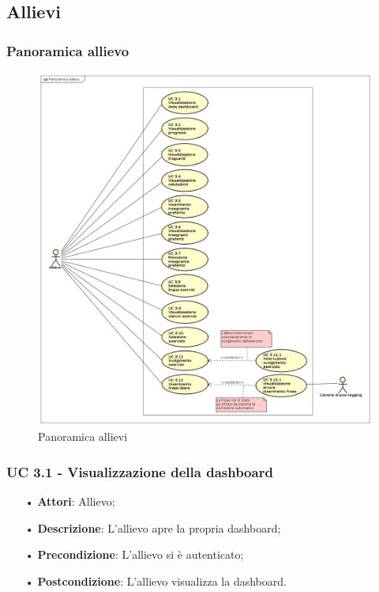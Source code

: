 \subsection{Allievi}
\subsubsection{Panoramica allievo}

\begin{figure}[H]
\centering
\includegraphics[width=17cm]{img/PanoramicaAllievi.png} 
\caption{Panoramica allievi}\label{fig:31}
\end{figure}


\subsubsection{UC 3.1 - Visualizzazione della dashboard}
\begin{itemize}
\item[•]\textbf{Attori}: Allievo;
\item[•]\textbf{Descrizione}: L'allievo apre la propria dashboard;
\item[•]\textbf{Precondizione}: L'allievo si è autenticato;
\item[•]\textbf{Postcondizione}: L'allievo visualizza la dashboard.
\end{itemize}

